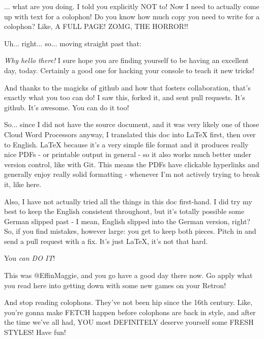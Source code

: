 \begin{colophon}
... what are you doing. I told you explicitly NOT to! Now I need to actually come up with text for a colophon! Do you know how much copy you need to write for a colophon? Like, A FULL PAGE! ZOMG, THE HORROR!!\footnotemark

Uh... right... so... moving straight past that:

\emph{Why hello there!} I sure hope you are finding yourself to be having an excellent day, today. Certainly a good one for hacking your console to teach it new tricks!

And thanks to the magicks of github and how that fosters collaboration, that's exactly what you too can do! I saw this, forked it, and sent pull requests. It's github. It's awesome. You can do it too!

So... since I did not have the source document, and it was very likely one of those Cloud Word Processors anyway, I translated this doc into LaTeX first, then over to English. LaTeX because it's a very simple file format and it produces really nice PDFs - or printable output in general - so it also works much better under version control, like with Git. This means the PDFs have clickable hyperlinks and generally enjoy really solid formatting - whenever I'm not actively trying to break it, like here.


Also, I have not actually tried all the things in this doc first-hand. I did try my best to keep the English consistent throughout, but it's totally possible some German slipped past - I mean, English slipped into the German version, right? So, if you find mistakes, however large: you get to keep both pieces. Pitch in and send a pull request with a fix. It's just LaTeX, it's not that hard.

You \emph{can DO IT}!

This was @EffinMaggie, and you go have a good day there now. Go apply what you read here into getting down with some new games on your Retron!

And stop reading colophons. They've not been hip since the 16th century. Like, you're gonna make FETCH happen before colophons are back in style, and after the time we've all had, YOU most DEFINITELY deserve yourself some FRESH STYLES! Have fun!

\end{colophon}

